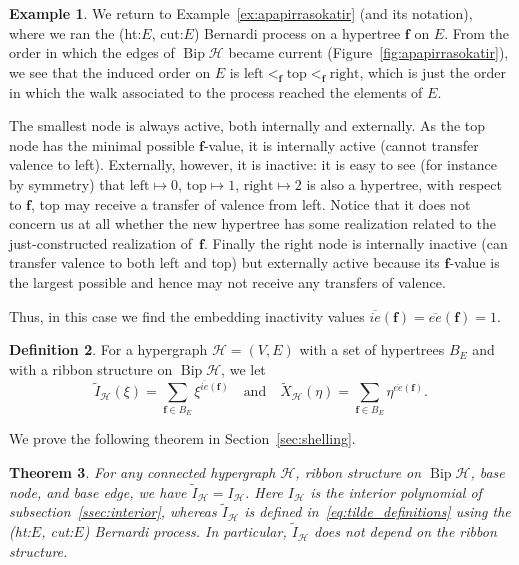 \documentclass[10pt]{amsart}
\newtheorem{theo}{Theorem}[section]
\theoremstyle{definition}\newtheorem{defi}[theo]{Definition}
\newtheorem{exam}[theo]{Example}
\theoremstyle{remark}\newtheorem{rema}[theo]{Remark}
\newcommand{\HH}{\mathcal H}
\DeclareMathOperator{\bip}{Bip}
\begin{document}
\begin{exam}
We return to Example~\ref{ex:apapirrasokatir} (and its notation), where we ran the (ht:$E$, cut:$E$) Bernardi process on a hypertree $\mathbf f$ on $E$. From the order in which the edges of $\bip\HH$ became current (\cf Figure~\ref{fig:apapirrasokatir}), we see that the induced order on $E$ is $\text{left}<_{\mathbf f}\text{top}<_{\mathbf f}\text{right}$, which is just the order in which the walk associated to the process reached the elements of $E$.

The smallest node is always active, both internally and externally. As the top node has the minimal possible $\mathbf f$-value, it is internally active (cannot transfer valence to left). Externally, however, it is inactive: it is easy to see (for instance by symmetry) that $\text{left}\mapsto0$, $\text{top}\mapsto1$, $\text{right}\mapsto2$ is also a hypertree, \ie with respect to $\mathbf f$, top may receive a transfer of valence from left. Notice that it does not concern us at all whether the new hypertree has some realization related to the just-constructed realization of~$\mathbf f$. Finally the right node is internally inactive (can transfer valence to both left and top) but externally active because its $\mathbf f$-value is the largest possible and hence may not receive any transfers of valence.

Thus, in this case we find the embedding inactivity values $\overline{ie}(\mathbf f)=\overline{ee}(\mathbf f)=1$.
\end{exam}

\begin{defi}
For a hypergraph $\HH=(V,E)$ with a set of hypertrees $B_E$ and with a ribbon structure on $\bip\HH$, we let
\begin{equation}
\label{eq:tilde_definitions}
\tilde{I}_\HH(\xi)=\sum_{\mathbf f\in B_E} \xi^{\overline{ie}(\mathbf f)}\quad\text{and}\quad\tilde{X}_\HH(\eta)=\sum_{\mathbf f\in B_E} \eta^{\overline{ee}(\mathbf f)}.
\end{equation}
\end{defi}

We prove the following theorem in Section~\ref{sec:shelling}.

\begin{theo}\label{thm:Bernardi-interior_well_def}
For any connected hypergraph $\HH$, ribbon structure on $\bip\HH$, base node, and base edge, we have $\tilde{I}_\HH=I_\HH$. Here $I_\HH$ is the interior polynomial of subsection~\ref{ssec:interior}, whereas $\tilde{I}_\HH$ is defined in~\eqref{eq:tilde_definitions} using the (ht:$E$, cut:$E$) Bernardi process.
In particular, $\tilde{I}_{\HH}$ does not depend on the ribbon structure.
\end{theo}
\end{document}

